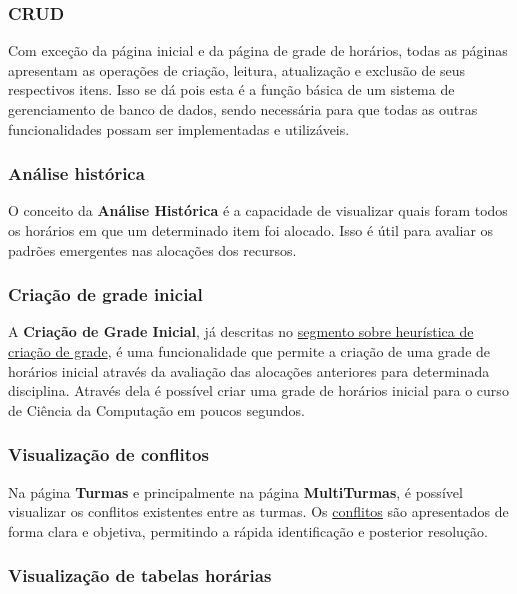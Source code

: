 \subsubsection*{\textbf{CRUD}} \label{sssec:CRUD}

Com exceção da página inicial e da página de grade de horários, todas as páginas apresentam as operações de criação, leitura, atualização e exclusão de seus respectivos itens. Isso se dá pois esta é a função básica de um sistema de gerenciamento de banco de dados, sendo necessária para que todas as outras funcionalidades possam ser implementadas e utilizáveis.

\subsubsection*{\textbf{Análise histórica}} \label{sssec:Análise histórica}

O conceito da \textbf{Análise Histórica} é a capacidade de visualizar quais foram todos os horários em que um determinado item foi alocado. Isso é útil para avaliar os padrões emergentes nas alocações dos recursos.

\subsubsection*{\textbf{Criação de grade inicial}} \label{sssec:Criação de grade inicial}

A \textbf{Criação de Grade Inicial}, já descritas no \hyperref[ssec:Heurística]{segmento sobre heurística de criação de grade}, é uma funcionalidade que permite a criação de uma grade de horários inicial através da avaliação das alocações anteriores para determinada disciplina. Através dela é possível criar uma grade de horários inicial para o curso de Ciência da Computação em poucos segundos.

\subsubsection*{\textbf{Visualização de conflitos}} \label{sssec:Visualização de conflitos}

Na página \textbf{Turmas} e principalmente na página \textbf{MultiTurmas}, é possível visualizar os conflitos existentes entre as turmas. Os \hyperref[sec:conflitos]{conflitos} são apresentados de forma clara e objetiva, permitindo a rápida identificação e posterior resolução.

\subsubsection*{\textbf{Visualização de tabelas horárias}} \label{sssec:Visualização de tabelas horárias}

